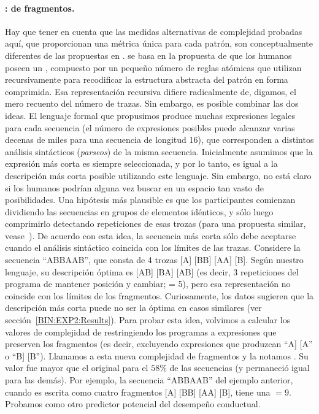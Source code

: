 \paragraph{\mdlbinfrag: \mdlbin de fragmentos.} Hay que tener en cuenta que las medidas alternativas de complejidad probadas aquí, que proporcionan una métrica única para cada patrón, son conceptualmente diferentes de las propuestas en \mdlbin. \mdlbin se basa en la propuesta de que los humanos poseen un \lot, compuesto por un pequeño número de reglas atómicas que utilizan recursivamente para recodificar la estructura abstracta del patrón en forma comprimida. Esa representación recursiva difiere radicalmente de, digamos, el mero recuento del número de trazas. Sin embargo, es posible combinar las dos ideas. El lenguaje formal que propusimos produce muchas expresiones legales para cada secuencia (el número de expresiones posibles puede alcanzar varias decenas de miles para una secuencia de longitud 16), que corresponden a distintos análisis sintácticos (\textit{parseos}) de la misma secuencia. Inicialmente asumimos que la expresión más corta es siempre seleccionada, y por lo tanto, \mdlbin es igual a la descripción más corta posible utilizando este lenguaje. Sin embargo, no está claro si los humanos podrían alguna vez buscar en un espacio tan vasto de posibilidades. Una hipótesis más plausible es que los participantes comienzan dividiendo las secuencias en grupos de elementos idénticos, y sólo luego comprimirlo detectando repeticiones de esas trozas (para una propuesta similar, vease~\cite{f33,leeuwenberg1971perceptual}). De acuerdo con esta idea, la secuencia más corta sólo debe aceptarse cuando el análisis sintáctico coincida con los límites de las trazas. Considere la secuencia ``ABBAAB'', que consta de 4 trozas [A] [BB] [AA] [B]. Según nuestro lenguaje, su descripción óptima es [AB] [BA] [AB] (es decir, 3 repeticiones del programa de mantener posición y cambiar; \mdlbin = 5), pero esa representación no coincide con los límites de los fragmentos. Curiosamente, los datos sugieren que la descripción más corta puede no ser la óptima en casos similares (ver sección~\ref{BIN:EXP2:Results}). Para probar esta idea, volvimos a calcular los valores de complejidad de \gramgeo restringiendo los programas a expresiones que preserven los fragmentos (es decir, excluyendo expresiones que produzcan ``A] [A'' o ``B] [B''). Llamamos a esta nueva complejidad \mdlbin de fragmentos y la notamos \mdlbinfrag. Su valor fue mayor que el original para el $58\%$ de las secuencias (y permaneció igual para las demás). Por ejemplo, la secuencia ``ABBAAB'' del ejemplo anterior, cuando es escrita como cuatro fragmentos [A] [BB] [AA] [B], tiene una \mdlbinfrag $= 9$. Probamos \mdlbinfrag como otro predictor potencial del desempeño conductual.

